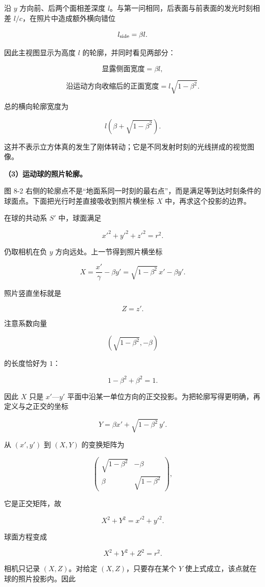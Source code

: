\documentclass[12pt,a4paper,UTF8]{ctexart}
\begin{document}
沿 \(y\) 方向前、后两个面相差深度
\(l\)。与第一问相同，后表面与前表面的发光时刻相差
\(l/c\)，在照片中造成额外横向错位

\[l_{\rm side}=\beta l.\]

因此主视图显示为高度 \(l\) 的轮廓，并同时看见两部分：

\[\boxed{\text{显露侧面宽度}=\beta l},\]

\[\boxed{\text{沿运动方向收缩后的正面宽度}=l\sqrt{1-\beta^2}}.\]

总的横向轮廓宽度为

\[\boxed{l\left(\beta+\sqrt{1-\beta^2}\right)}.\]

这并不表示立方体真的发生了刚体转动；它是不同发射时刻的光线拼成的视觉图像。

\textbf{（3）运动球的照片轮廓。}

图 8-2
右侧的轮廓点不是``地面系同一时刻的最右点''，而是满足等到达时刻条件的球面点。下面把光行时差直接吸收到照片横坐标
\(X\) 中，再求这个投影的边界。

在球的共动系 \(S'\) 中，球面满足

\[x'^2+y'^2+z'^2=r^2.\]

仍取相机在负 \(y\) 方向远处。上一节得到照片横坐标

\[X=\frac{x'}\gamma-\beta y'
=\sqrt{1-\beta^2}\,x'-\beta y'.\]

照片竖直坐标就是

\[Z=z'.\]

注意系数向量

\[\left(\sqrt{1-\beta^2},-\beta\right)\]

的长度恰好为 \(1\)：

\[1-\beta^2+\beta^2=1.\]

因此 \(X\) 只是 \(x'\)---\(y'\)
平面中沿某一单位方向的正交投影。为把轮廓写得更明确，再定义与之正交的坐标

\[Y=\beta x'+\sqrt{1-\beta^2}\,y'.\]

从 \((x',y')\) 到 \((X,Y)\) 的变换矩阵为

\[
\begin{pmatrix}
\sqrt{1-\beta^2}&-\beta\\
\beta&\sqrt{1-\beta^2}
\end{pmatrix},
\]

它是正交矩阵，故

\[X^2+Y^2=x'^2+y'^2.\]

球面方程变成

\[X^2+Y^2+Z^2=r^2.\]

相机只记录 \((X,Z)\)。对给定 \((X,Z)\)，只要存在某个 \(Y\)
使上式成立，该点就在球的照片投影内。因此
\end{document}
